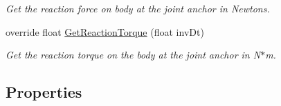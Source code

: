 \begin{DoxyCompactItemize}
\begin{DoxyCompactList}\small\item\em Get the reaction force on body at the joint anchor in Newtons. \end{DoxyCompactList}\item 
override float \hyperlink{class_farseer_physics_1_1_dynamics_1_1_joints_1_1_prismatic_joint_a0786561dbda2ff4ac0ca4de0ade29907}{Get\+Reaction\+Torque} (float inv\+Dt)
\begin{DoxyCompactList}\small\item\em Get the reaction torque on the body at the joint anchor in N$\ast$m. \end{DoxyCompactList}\end{DoxyCompactItemize}
\subsection*{Properties}
